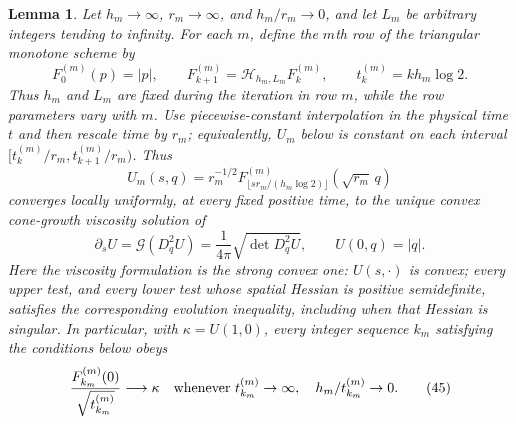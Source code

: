 \documentclass{smfart}
\newtheorem{lemma}[theorem]{Lemma}
\theoremstyle{definition}
\newcommand{\1}{\mathbf 1}
\begin{document}
\begin{lemma}\label{lem:viscosity-limit}
Let $h_ m\to\infty$, $r_ m\to\infty$, and $h_ m/r_ m\to0$, and let
$L_ m$ be arbitrary integers tending to infinity.  For each $m$, define the
$m$th row of the triangular monotone scheme by
\begin{equation}
F_0^{(m)}(p)=|p|,\qquad
F_{k+1}^{(m)}=\mathcal H_{h_m,L_m}F_k^{(m)},
\qquad t_k^{(m)}=k h_m\log2.
\tag{42}
\end{equation}
Thus $h_m$ and $L_m$ are fixed during the iteration in row $m$, while the
row parameters vary with $m$.  Use piecewise-constant interpolation in the
physical time $t$ and then rescale time by $r_m$; equivalently, $U_m$ below is
constant on each interval
$[t_k^{(m)}/r_m,t_{k+1}^{(m)}/r_m)$.  Thus
\begin{equation}
U_ m(s,q)=r_ m^{-1/2}F_{\lfloor sr_ m/(h_ m\log2)\rfloor}^{(m)}
(\sqrt{r_ m}\,q)
\tag{43}
\end{equation}
converges locally uniformly, at every fixed positive time, to the unique
convex cone-growth viscosity solution of
\begin{equation}
\partial_ sU=\mathcal G(D_ q^2U)=\frac1{4\pi}\sqrt{\det D_ q^2U},
\qquad U(0,q)=|q|.
\tag{44}
\end{equation}
Here the viscosity formulation is the strong convex one:
$U(s,\cdot)$ is convex; every upper test, and every lower test whose
spatial Hessian is positive semidefinite, satisfies the corresponding
evolution inequality, including when that Hessian is singular.  In
particular, with $\kappa=U(1,0)$, every integer sequence $k_m$ satisfying
the conditions below obeys
\begin{equation}
\frac{F_{k_m}^{(m)}(0)}{\sqrt{t_{k_m}^{(m)}}}\longrightarrow\kappa
\quad\hbox{whenever }t_{k_m}^{(m)}\to\infty,
\quad h_m/t_{k_m}^{(m)}\to0.
\tag{45}
\end{equation}

\end{lemma}
\end{document}
